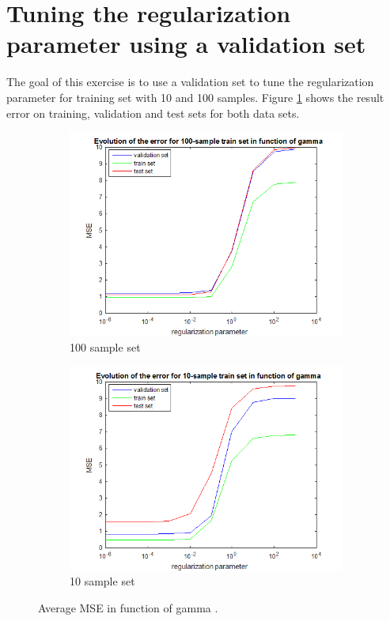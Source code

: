 \documentclass{article} %
\begin{document}
\section{Tuning the regularization parameter using a validation set}
The goal of this exercise is to use a validation set to tune the regularization parameter for training set with 10 and 100 samples. Figure \ref{fig:ex5} shows the result error on training, validation and test sets for both data sets.
 \begin{figure}[h]
\center
 \begin{subfigure}[b]{0.45\textwidth}
        \includegraphics[width=\textwidth]{5_100}
        \caption{100 sample set}
    \end{subfigure}
    \begin{subfigure}[b]{0.45\textwidth}
        \includegraphics[width=\textwidth]{5_10}
        \caption{10 sample set}
    \end{subfigure}
    \caption{Average MSE in function of gamma .}
    \label{fig:ex5}
\end{figure}
\end{document}
